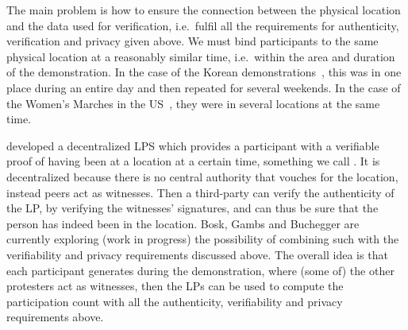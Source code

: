 The main problem is how to ensure the connection between the physical location 
and the data used for verification, i.e.\ fulfil all the requirements for 
authenticity, verification and privacy given above.
We must bind participants to the same physical location at a reasonably similar 
time, i.e.\ within the area and duration of the demonstration.
In the case of the Korean demonstrations~\cite{2016DemonstrationsInSeoul}, this 
was in one place during an entire day and then repeated for several 
weekends.
In the case of the Women's Marches in the US~\cite{2017WomensMarchesInUS}, they
were in several locations at the same time.


\textcite{PROPS} developed a decentralized \ac{LPS} which provides 
a participant with a verifiable proof of having been at a location at a certain 
time, something we call .
It is decentralized because there is no central authority that vouches for the 
location, instead peers act as witnesses.
Then a third-party can verify the authenticity of the \ac{LP}, by verifying the 
witnesses' signatures, and can thus be sure that the person has indeed been in 
the location.
Bosk, Gambs and Buchegger are currently exploring (work in progress) the 
possibility of combining such  with the verifiability and privacy 
requirements discussed above.
The overall idea is that each participant generates  during the 
demonstration, where (some of) the other protesters act as witnesses, then the 
\acp{LP} can be used to compute the participation count with all the 
authenticity, verifiability and privacy requirements above.
